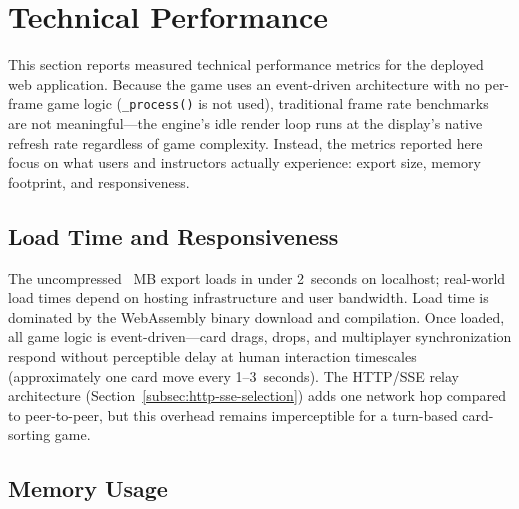 
\section{Technical Performance}
\label{sec:technical-performance}

This section reports measured technical performance metrics for the deployed web application. Because the game uses an event-driven architecture with no per-frame game logic (\texttt{\_process()} is not used), traditional frame rate benchmarks are not meaningful---the engine's idle render loop runs at the display's native refresh rate regardless of game complexity. Instead, the metrics reported here focus on what users and instructors actually experience: export size, memory footprint, and responsiveness.

\subsection{Load Time and Responsiveness}
\label{subsec:load-time}

The uncompressed \exportSizeUncompressed~MB export loads in under 2~seconds on localhost; real-world load times depend on hosting infrastructure and user bandwidth. Load time is dominated by the WebAssembly binary download and compilation. Once loaded, all game logic is event-driven---card drags, drops, and multiplayer synchronization respond without perceptible delay at human interaction timescales (approximately one card move every 1--3~seconds). The HTTP/SSE relay architecture (Section~\ref{subsec:http-sse-selection}) adds one network hop compared to peer-to-peer, but this overhead remains imperceptible for a turn-based card-sorting game.

\subsection{Memory Usage}
\label{subsec:memory}

